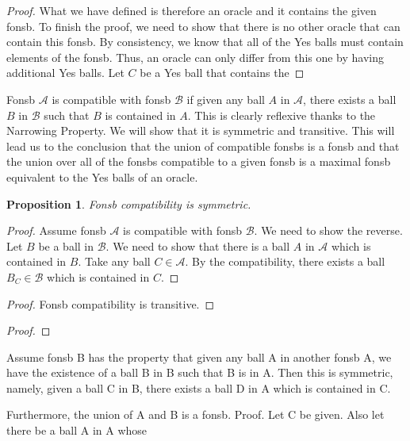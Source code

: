 \documentclass[12pt]{article}
\newtheorem{proposition}{Proposition}[section]
\begin{document}
\begin{proof}
    What we have defined is therefore an oracle and it contains the given fonsb. To finish the proof, we need to show that there is no other oracle that can contain this fonsb. By consistency, we know that all of the Yes balls must contain elements of the fonsb. Thus, an oracle can only differ from this one by having additional Yes balls. Let $C$ be a Yes ball that contains the 
    
\end{proof}




Fonsb $\mathcal{A}$ is compatible with fonsb $\mathcal{B}$ if given any ball $A$ in $\mathcal{A}$, there exists a ball $B$ in $\mathcal{B}$ such that $B$ is contained in $A$. This is clearly reflexive thanks to the Narrowing Property. We will show that it is symmetric and transitive. This will lead us to the conclusion that the union of compatible fonsbs is a fonsb and that the union over all of the fonsbs compatible to a given fonsb is a maximal fonsb equivalent to the Yes balls of an oracle.  

\begin{proposition}
 Fonsb compatibility is symmetric.
\end{proposition}

\begin{proof}
    Assume fonsb $\mathcal{A}$ is compatible with fonsb $\mathcal{B}$. We need to show the reverse. Let $B$ be a ball in $\mathcal{B}$. We need to show that there is a ball $A$ in $\mathcal{A}$ which is contained in $B$. Take any ball $C \in \mathcal{A}$. By the compatibility, there exists a ball $B_C \in \mathcal{B}$ which is contained in $C$. 
\end{proof}

\begin{proof}
    Fonsb compatibility is transitive.
\end{proof}

\begin{proof}
    
\end{proof}

 Assume fonsb B has the property that given any ball A in another
fonsb A, we have the existence of a ball B in B such that B is in A. Then this is
symmetric, namely, given a ball C in B, there exists a ball D in A which is contained
in C. 


Furthermore, the union of A and B is a fonsb.
Proof. Let C be given. Also let there be a ball A in A whose
\end{document}
